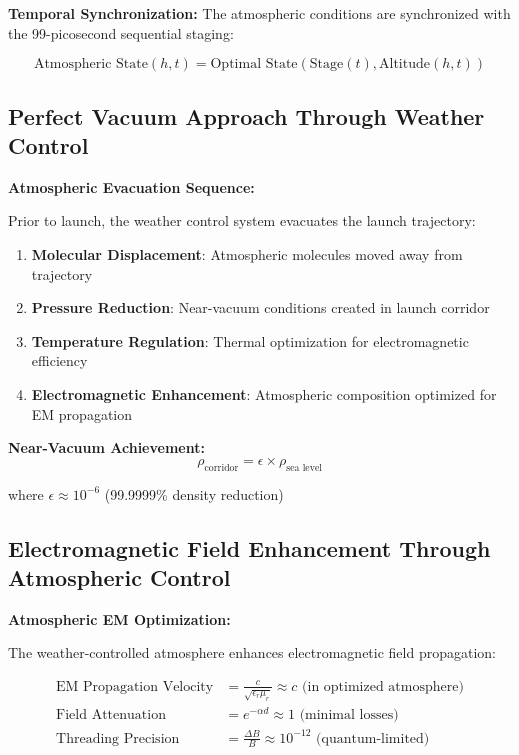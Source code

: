 \documentclass[12pt,a4paper]{article}
\begin{document}
\textbf{Temporal Synchronization:}
The atmospheric conditions are synchronized with the 99-picosecond sequential staging:

\begin{equation}
\text{Atmospheric State}(h,t) = \text{Optimal State}(\text{Stage}(t), \text{Altitude}(h,t))
\end{equation}

\subsection{Perfect Vacuum Approach Through Weather Control}

\textbf{Atmospheric Evacuation Sequence:}

Prior to launch, the weather control system evacuates the launch trajectory:

\begin{enumerate}
\item \textbf{Molecular Displacement}: Atmospheric molecules moved away from trajectory
\item \textbf{Pressure Reduction}: Near-vacuum conditions created in launch corridor
\item \textbf{Temperature Regulation}: Thermal optimization for electromagnetic efficiency
\item \textbf{Electromagnetic Enhancement}: Atmospheric composition optimized for EM propagation
\end{enumerate}

\textbf{Near-Vacuum Achievement:}
\begin{equation}
\rho_{\text{corridor}} = \epsilon \times \rho_{\text{sea level}}
\end{equation}

where $\epsilon \approx 10^{-6}$ (99.9999\% density reduction)

\subsection{Electromagnetic Field Enhancement Through Atmospheric Control}

\textbf{Atmospheric EM Optimization:}

The weather-controlled atmosphere enhances electromagnetic field propagation:

\begin{align}
\text{EM Propagation Velocity} &= \frac{c}{\sqrt{\epsilon_r \mu_r}} \approx c \text{ (in optimized atmosphere)} \\
\text{Field Attenuation} &= e^{-\alpha d} \approx 1 \text{ (minimal losses)} \\
\text{Threading Precision} &= \frac{\Delta B}{B} \approx 10^{-12} \text{ (quantum-limited)}
\end{align}
\end{document}
